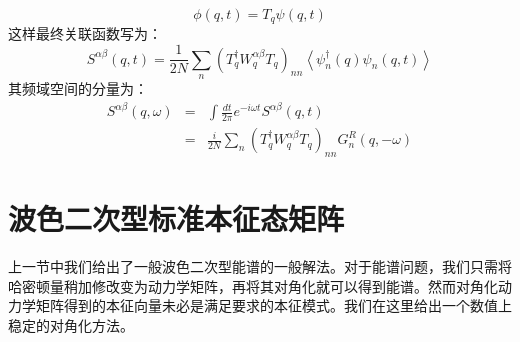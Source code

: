 \documentclass[UTF8]{ctexart}
\begin{document}
\begin{equation}
\phi\left(q,t\right)=T_{q}\psi\left(q,t\right)
\end{equation}
这样最终关联函数写为：
\begin{equation}
S^{\alpha\beta}\left(q,t\right)=\frac{1}{2N}\sum_{n}\left(T_{q}^{\dagger}W_{q}^{\alpha\beta}T_{q}\right)_{nn}\left\langle \psi_{n}^{\dagger}\left(q\right)\psi_{n}\left(q,t\right)\right\rangle 
\end{equation}
其频域空间的分量为：
\begin{eqnarray}
S^{\alpha\beta}\left(q,\omega\right) & = & \int\frac{dt}{2\pi}e^{-i\omega t}S^{\alpha\beta}\left(q,t\right)\nonumber \\
 & = & \frac{i}{2N}\sum_{n}\left(T_{q}^{\dagger}W_{q}^{\alpha\beta}T_{q}\right)_{nn}G_{n}^{R}\left(q,-\omega\right)
\end{eqnarray}


\section*{波色二次型标准本征态矩阵}
\noindent
上一节中我们给出了一般波色二次型能谱的一般解法。对于能谱问题，我们只需将哈密顿量稍加修改变为动力学矩阵，再将其对角化就可以得到能谱。然而对角化动力学矩阵得到的本征向量未必是满足要求的本征模式。我们在这里给出一个数值上稳定的对角化方法。
\end{document}
